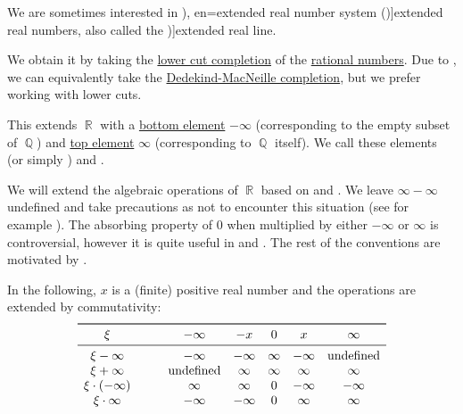 \begin{definition}\label{def:extended_real_numbers}\mimprovised
  We are sometimes interested in \term[ru=расширенная вещественная прямая (\cite[23]{ИоффеТихомиров1974ЭкстремЗадачи}), en=extended real number system (\cite[10]{Folland1999RealAnalysis})]{extended real numbers}, also called the \term[en=extended real line (\cite[\S 1.4]{Rudin1987RealAndComplexAnalysis})]{extended real line}.

  We obtain it by taking the \hyperref[def:lower_cut_completion]{ lower cut completion} of the \hyperref[def:rational_numbers]{rational numbers}. Due to , we can equivalently take the \hyperref[def:dedekind_macnielle_completion]{Dedekind-MacNeille completion}, but we prefer working with lower cuts.

  This extends \( \BbbR \) with a \hyperref[def:extremal_points/top_and_bottom]{bottom element} \( -\infty \) (corresponding to the empty subset of \( \BbbQ \)) and \hyperref[def:extremal_points/top_and_bottom]{top element} \( \infty \) (corresponding to \( \BbbQ \) itself). We call these elements  (or simply ) and .

  We will extend the algebraic operations of \( \BbbR \) based on \cite[\S 1.1.17]{Schechter1997AnalysisHandbook} and \cite[11]{Folland1999RealAnalysis}. We leave \( \infty - \infty \) undefined and take precautions as not to encounter this situation (see for example ). The absorbing property of \( 0 \) when multiplied by either \( -\infty \) or \( \infty \) is controversial, however it is quite useful in  and . The rest of the conventions are motivated by .

  In the following, \( x \) is a (finite) positive real number and the operations are extended by commutativity:
  \begin{equation*}
    \begin{array}{c !{\qquad} *{5}{c}}
      \toprule
      \xi                 & -\infty       & -x      & 0      & x       & \infty        \\
      \midrule
      \xi - \infty        & -\infty       & -\infty & \infty & -\infty & \T{undefined} \\
      \xi + \infty        & \T{undefined} & \infty  & \infty & \infty  & \infty \\
      \xi \cdot (-\infty) & \infty        & \infty  & 0      & -\infty & -\infty \\
      \xi \cdot \infty    & -\infty       & -\infty & 0      & \infty  & \infty \\
    \end{array}
  \end{equation*}
\end{definition}

